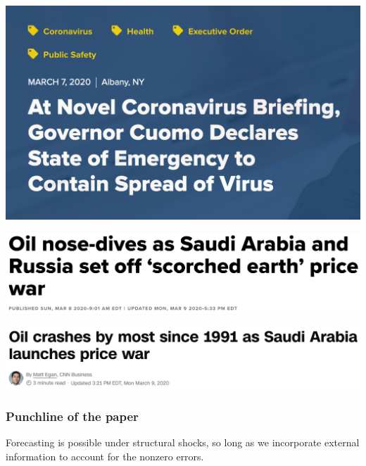 \documentclass{beamer}
\theoremstyle{definition}
\begin{document}
\begin{frame}

    \begin{example}
        \href{https://www.governor.ny.gov/news/novel-coronavirus-briefing-governor-cuomo-declares-state-emergency-contain-spread-virus}{\includegraphics[scale=.3]{NYS_state.png}}

        \href{https://www.cnbc.com/2020/03/08/opec-deal-collapse-sparks-price-war-20-oil-in-2020-is-coming.html}{\includegraphics[scale=.3]{cnn.png}}

        \href{https://www.cnn.com/2020/03/08/investing/oil-prices-crash-opec-russia-saudi-arabia/index.html}{\includegraphics[scale=.3]{cnbc.png}}
        \end{example}


 
\end{frame}

\begin{frame}
\frametitle{Punchline of the paper}

Forecasting is possible under structural shocks, so long as we incorporate external information to account for the nonzero errors.

\end{frame}
\end{document}
